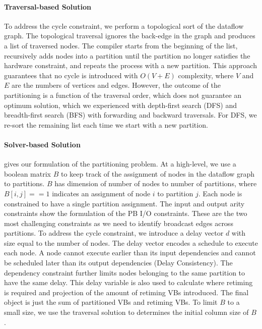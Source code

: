 \paragraph{Traversal-based Solution}
To address the cycle constraint, we perform a topological sort of the dataflow graph.
The topological traversal ignores the back-edge in the graph and produces a list of traversed nodes. 
The compiler starts from the beginning of the list, recursively adds nodes into a partition until the partition no longer satisfies the hardware constraint, and repeats the process with a new partition.
This approach guarantees that no cycle is introduced with $O(V+E)$ complexity, where $V$ and $E$ are the numbers of vertices and edges.
However, the outcome of the partitioning is a function of the traversal order, which does not guarantee an optimum solution, which we experienced with depth-first search (DFS) and breadth-first search (BFS) with forwarding and backward traversals.
For DFS, we re-sort the remaining list each time we start with a new partition.


\paragraph{Solver-based Solution}
 gives our formulation of the partitioning problem.
At a high-level, we use a boolean matrix $B$ to keep track of the assignment of nodes in the dataflow graph to partitions. 
$B$ has dimension of number of nodes to number of partitions, where$B[i,j]==1$ indicates an assignment of node $i$ to partition $j$. 
Each node is constrained to have a single partition assignment.
The input and output arity constraints show the formulation of the PB I/O constraints.
These are the two most challenging constraints as we need to identify broadcast edges across partitions.
To address the cycle constraint, we introduce a delay vector $d$ with size equal to the number of nodes. 
The delay vector encodes a schedule to execute each node. 
A node cannot execute earlier than its input dependencies and cannot be scheduled later than its output dependencies (Delay Consistency).
The dependency constraint further limits nodes belonging to the same partition to have the same delay.
This delay variable is also used to calculate where retiming is required and projection of the amount of retiming VBs introduced. 
The final object is just the sum of partitioned VBs and retiming VBs.
To limit $B$ to a small size, we use the traversal solution to determines the initial column size of $B$.

